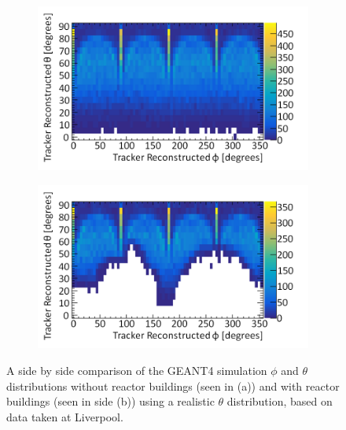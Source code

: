\begin{figure}[!h]
\centering
\begin{subfigure}{.5\textwidth}
  \centering
  \includegraphics[width=0.9\linewidth]{Chapter6/Figs/Raster/thetaVsPhiSimulatedWithReactor0MedText.png}
  \captionsetup{width=.9\linewidth}
  \caption{}
  \label{subFig:thetaVsPhiSimulatedWithReactor0}
\end{subfigure}%
\begin{subfigure}{.5\textwidth}
  \centering
\includegraphics[width=0.9\linewidth]{Chapter6/Figs/Raster/thetaVsPhiSimulatedWithReactor100MedText.png}
  \captionsetup{width=.9\linewidth}
  \caption{}
  \label{subFig:thetaVsPhiSimulatedWithReactor100}
\end{subfigure}
\caption[A side by side comparison of the GEANT4 simulation $\phi$ and $\theta$ distributions.]{A side by side comparison of the GEANT4 simulation $\phi$ and $\theta$ distributions without reactor buildings (seen in (a)) and with reactor buildings (seen in side (b)) using a realistic $\theta$ distribution, based on data taken at Liverpool.}
\label{fig:thetaVsPhiSimulatedWithReactor_0-100}
\end{figure}

